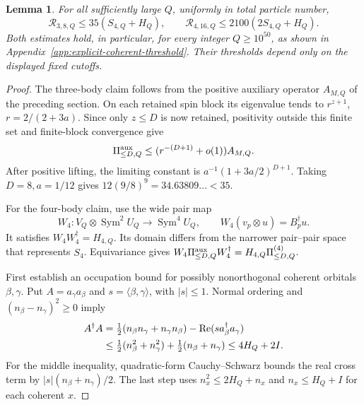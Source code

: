 \documentclass[11pt]{article}
\newtheorem{lemma}{Lemma}
\newcommand{\Sym}{\operatorname{Sym}}
\begin{document}
\begin{lemma}\label{lem:finite-errors}
For all sufficiently large $Q$, uniformly in total particle number,
\begin{equation}\label{eq:error-bounds}
 \mathcal R_{3,8,Q}\le35(S_{4,Q}+H_Q),\qquad
 \mathcal R_{4,16,Q}\le2100(2S_{4,Q}+H_Q).
\end{equation}
Both estimates hold, in particular, for every integer $Q\ge10^{50}$,
as shown in Appendix~\ref{app:explicit-coherent-threshold}. Their thresholds
depend only on the displayed fixed cutoffs.
\end{lemma}
\begin{proof}
The three-body claim follows from the positive auxiliary operator
$A_{M,Q}$ of the preceding section. On each retained spin block its
eigenvalue tends to $r^{z+1}$, $r=2/(2+3a)$. Since only $z\le D$ is now
retained, positivity outside this finite set and finite-block convergence
give
\begin{equation}
 \Pi^{\rm aux}_{\le D,Q}\le(r^{-(D+1)}+o(1))A_{M,Q}.
\end{equation}
After positive lifting, the limiting constant is
$a^{-1}(1+3a/2)^{D+1}$. Taking $D=8,a=1/12$ gives
$12(9/8)^9=34.63809\ldots<35$.

For the four-body claim, use the wide pair map
\begin{equation}
 W_4:V_Q\otimes\Sym^2U_Q\longrightarrow\Sym^4U_Q,
 \qquad W_4(v_p\otimes u)=B_p^\dagger u.
\end{equation}
It satisfies $W_4W_4^\dagger=H_{4,Q}$. Its domain differs from the narrower
pair--pair space that represents $S_4$. Equivariance gives
$W_4\Pi^{\rm aux}_{\le D,Q}W_4^\dagger
=H_{4,Q}\Pi^{(4)}_{\le D,Q}$.

First establish an occupation bound for possibly nonorthogonal coherent
orbitals $\beta,\gamma$. Put $A=a_\gamma a_\beta$ and
$s=\langle\beta,\gamma\rangle$, with $|s|\le1$. Normal ordering and
$(n_\beta-n_\gamma)^2\ge0$ imply
\begin{align}
 A^\dagger A
 &=\tfrac12(n_\beta n_\gamma+n_\gamma n_\beta)
       -\operatorname{Re}(s a_\beta^\dagger a_\gamma)\notag\\
 &\le\tfrac12(n_\beta^2+n_\gamma^2)
       +\tfrac12(n_\beta+n_\gamma)
 \le4H_Q+2I.\label{eq:two-spectators}
\end{align}
For the middle inequality, quadratic-form Cauchy--Schwarz bounds the real
cross term by $|s|(n_\beta+n_\gamma)/2$. The last step uses
$n_x^2\le2H_Q+n_x$ and $n_x\le H_Q+I$ for each coherent $x$.


\end{proof}
\end{document}

